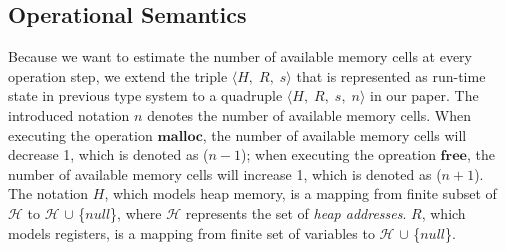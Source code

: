 \documentclass[english]{jssst_ppl} %
\newcommand\coma{,\;}
\newcommand\Malloc{\mathbf{malloc}}
\newcommand\Free{\mathbf{free}}
\begin{document}
\subsection{Operational Semantics}
Because we want to estimate the number of available memory cells at every operation step, we extend the triple $\langle H\coma R\coma s \rangle$ that is represented as run-time state in previous type system to a quadruple $\langle H\coma R\coma s\coma n \rangle$ in our paper. The introduced notation $n$ denotes the number of available memory cells. When executing the operation $\Malloc$, the number of available memory cells will decrease 1, which is denoted as ($n - 1$); when executing the opreation $\Free$, the number of available memory cells will increase 1, which is denoted as ($n + 1$). The notation $H$, which models heap memory, is a mapping from finite subset of $\mathcal{H}$ to $\mathcal{H}$ $\cup$ \{$null$\}, where $\mathcal{H}$ represents the set of \emph{heap addresses}. $R$, which models registers, is a mapping from finite set of variables to $\mathcal{H}$ $\cup$ \{$null$\}.
\end{document}
